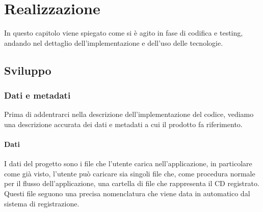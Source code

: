 
\chapter{Realizzazione}
\label{cap:realizzazione}
In questo capitolo viene spiegato come si è agito in fase di codifica e testing, andando nel dettaglio dell'implementazione e dell'uso delle tecnologie.

\section{Sviluppo}

\subsection{Dati e metadati}
Prima di addentrarci nella descrizione dell'implementazione del codice, vediamo una descrizione accurata dei dati e metadati a cui il prodotto fa riferimento.
\subsubsection{Dati}
I dati del progetto sono i file che l'utente carica nell'applicazione, in particolare come già visto, l'utente può caricare sia singoli file che, come procedura normale per il flusso dell'applicazione,
una cartella di file che rappresenta il CD registrato.
Questi file seguono una precisa nomenclatura che viene data in automatico dal sistema di registrazione.
